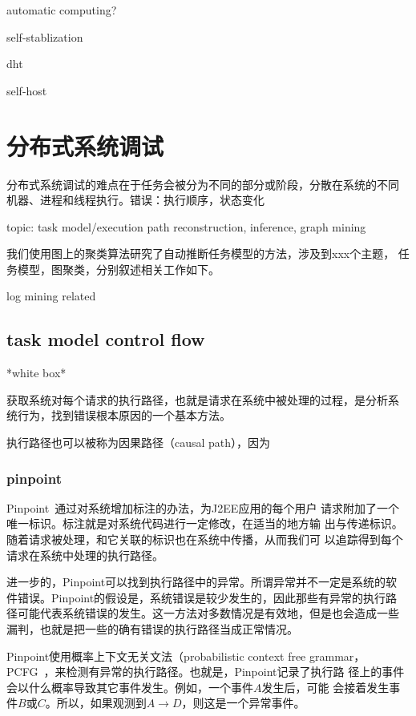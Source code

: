 automatic computing?

self-stablization

dht

self-host

\section{分布式系统调试}

分布式系统调试的难点在于任务会被分为不同的部分或阶段，分散在系统的不同
机器、进程和线程执行。错误：执行顺序，状态变化

topic: task model/execution path reconstruction, inference, graph
mining

我们使用图上的聚类算法研究了自动推断任务模型的方法，涉及到xxx个主题，
任务模型，图聚类，分别叙述相关工作如下。

log mining related

\subsection{task model control flow}

*white box*

获取系统对每个请求的执行路径，也就是请求在系统中被处理的过程，是分析系
统行为，找到错误根本原因的一个基本方法。

执行路径也可以被称为因果路径（causal path），因为


\subsubsection*{pinpoint}

Pinpoint~\cite{pinpoint}通过对系统增加标注的办法，为J2EE应用的每个用户
请求附加了一个唯一标识。标注就是对系统代码进行一定修改，在适当的地方输
出与传递标识。随着请求被处理，和它关联的标识也在系统中传播，从而我们可
以追踪得到每个请求在系统中处理的执行路径。

进一步的，Pinpoint可以找到执行路径中的异常。所谓异常并不一定是系统的软
件错误。Pinpoint的假设是，系统错误是较少发生的，因此那些有异常的执行路
径可能代表系统错误的发生。这一方法对多数情况是有效地，但是也会造成一些
漏判，也就是把一些的确有错误的执行路径当成正常情况。

Pinpoint使用概率上下文无关文法（probabilistic context free grammar，
PCFG~\cite{pcfg}，来检测有异常的执行路径。也就是，Pinpoint记录了执行路
径上的事件会以什么概率导致其它事件发生。例如，一个事件$A$发生后，可能
会接着发生事件$B$或$C$。所以，如果观测到$A \to D$，则这是一个异常事件。

